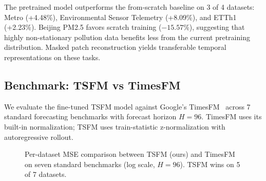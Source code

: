 \documentclass[journal]{IEEEtran}
\begin{document}
The pretrained model outperforms the from-scratch baseline on 3 of 4 datasets: Metro (+4.48\%), Environmental Sensor Telemetry (+8.09\%), and ETTh1 (+2.23\%). Beijing PM2.5 favors scratch training ($-15.57$\%), suggesting that highly non-stationary pollution data benefits less from the current pretraining distribution. Masked patch reconstruction yields transferable temporal representations on these tasks.

\subsection{Benchmark: TSFM vs TimesFM}
We evaluate the fine-tuned TSFM model against Google's TimesFM~\cite{timesfm} across 7 standard forecasting benchmarks with forecast horizon $H=96$. TimesFM uses its built-in normalization; TSFM uses train-statistic z-normalization with autoregressive rollout.

\begin{table}[t]
\caption{TSFM vs TimesFM: Per-Dataset Comparison (H=96)}
\label{tab:benchmark_comparison}
\centering

\end{table}

\begin{table}[t]
\caption{Benchmark Leaderboard (Ranked by Mean MSE)}
\label{tab:benchmark_leaderboard}
\centering
\scriptsize

\end{table}

\begin{figure}[t]
\centering
{}
\caption{Per-dataset MSE comparison between TSFM (ours) and TimesFM on seven standard benchmarks (log scale, $H{=}96$). TSFM wins on 5 of 7 datasets.}
\label{fig:benchmark_bar}
\end{figure}
\end{document}
